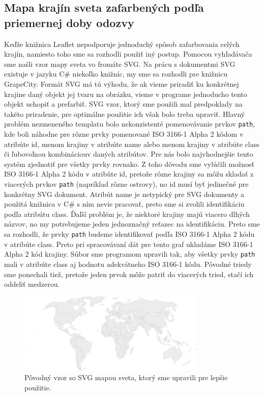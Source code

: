 \subsection{Mapa krajín sveta zafarbených podľa priemernej doby odozvy}
Keďže knižnica Leaflet nepodporuje jednoduchý spôsob zafarbovania celých krajín, namiesto toho sme sa rozhodli použiť iný postup. Pomocou vyhľadávača sme
našli vzor mapy sveta vo fromáte SVG. Na prácu s dokumentmi SVG existuje v jazyku C\# niekoľko knižníc, my sme sa rozhodli pre knižnicu GrapeCity. 
Formát SVG má tú výhodu, že ak vieme priradiť ku konkrétnej krajine daný objekt jej tvaru na obrázku, vieme v programe 
jednoducho tento objekt uchopiť a prefarbiť. SVG vzor, ktorý sme použili \cite{svg_mapa} mal predpoklady na takéto priradenie, pre optimálne použitie ich 
však bolo treba upraviť. Hlavný problém nezmeneného templatu bolo nekonzistenté pomenovávanie prvkov \lstinline{path}, kde boli náhodne pre rôzne prvky 
pomenované ISO 3166-1 Alpha 2 kôdom v atribúte id, menom krajiny v atribúte name alebo menom krajiny v atribúte class či ľubovoľnou kombináciouv daných atribútov. 
Pre nás bolo najvhodnejšie tento systém zjednotiť pre všetky prvky rovnako. Z toho dôvodu sme vylúčili možnosť ISO 3166-1 Alpha 2 kódu v atribúte id, pretože rôzne krajiny 
sa môžu skladať z viacerých prvkov \lstinline{path} (napríklad rôzne ostrovy), no id musí byť jedinečné pre konkrétny SVG dokument. Atribút name je netypický 
pre SVG dokumenty a použitá knižnica v C\# s ním nevie pracovať, preto sme si zvolili identifikáciu podľa atribútu class. Ďaľší problém je, že niektoré krajiny 
majú viacero dlhých názvov, no my potrebujeme jeden jednoznačný reťazec na identifikáciu. Preto sme sa rozhodli, že prvky \lstinline{path} budeme identifikovať 
podľa ISO 3166-1 Alpha 2 kódu v atribúte class. Preto pri spracovávaní dát pre tento graf ukladáme ISO 3166-1 Alpha 2 kód krajiny. Súbor sme programom 
upravili tak, aby všetky prvky \lstinline{path} mali v atribúte class aj hodnotu adekvátneho ISO 3166-1 kôdu. Pôvodné triedy sme ponechali tiež, pretože jeden 
prvok môže patriť do viacerých tried, stačí ich oddeliť medzerou. 


\begin{figure}
    \centerline{\includegraphics[width=0.8\textwidth]{images/world}}
    \caption[Neupravený svg vzor]{Pôvodný vzor so SVG mapou sveta, ktorý sme upravili pre lepšie použitie. }
    \label{obr:world}
\end{figure}

